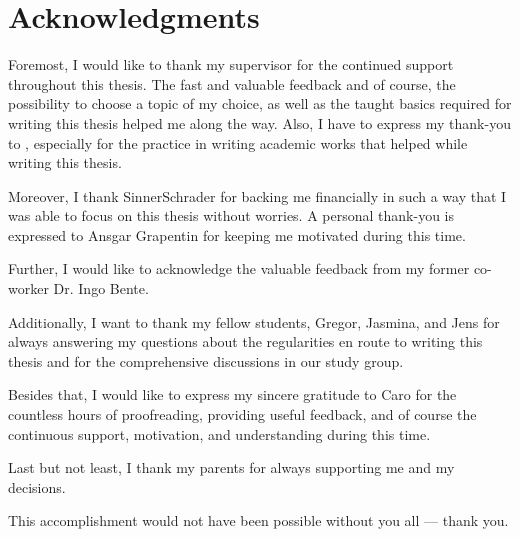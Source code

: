 \chapter*{Acknowledgments}
\thispagestyle{noheader}

Foremost, I would like to thank my supervisor \firstTutor{} for the continued support throughout this thesis. The fast and valuable feedback and of course, the possibility to choose a topic of my choice, as well as the taught basics required for writing this thesis helped me along the way. Also, I have to express my thank-you to \secondTutor, especially for the practice in writing academic works that helped while writing this thesis.

Moreover, I thank SinnerSchrader for backing me financially in such a way that I was able to focus on this thesis without worries. A personal thank-you is expressed to Ansgar Grapentin for keeping me motivated during this time.

Further, I would like to acknowledge the valuable feedback from my former co-worker Dr. Ingo Bente.

Additionally, I want to thank my fellow students, Gregor, Jasmina, and Jens for always answering my questions about the regularities en route to writing this thesis and for the comprehensive discussions in our study group.

Besides that, I would like to express my sincere gratitude to Caro for the countless hours of proofreading, providing useful feedback, and of course the continuous support, motivation, and understanding during this time.

Last but not least, I thank my parents for always supporting me and my decisions.

This accomplishment would not have been possible without you all --- thank you.

\newpage
